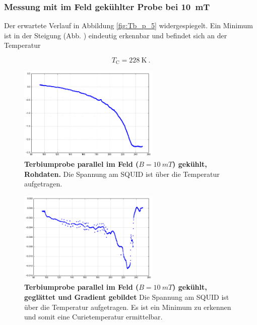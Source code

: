 \documentclass[a4paper,ngerman]{scrartcl}
\begin{document}
\subsubsection*{Messung mit im Feld gekühlter Probe bei \SI{10}{mT}}

Der erwartete Verlauf in Abbildung \ref{fig:Tb_p_5} widergespiegelt.
Ein Minimum ist in der Steigung (Abb. ) eindeutig erkennbar und befindet sich an der Temperatur

\begin{equation}
T_{\mathrm{C}} = \SI{228}{\K} ~.
\end{equation}



\begin{figure}
\centering
\includegraphics[width=0.6\textwidth]{abbildungen/Tb_p_10.png}
\caption[Terbiumprobe parallel bei 10mT]{\textbf{Terbiumprobe parallel im Feld ($B = \SI{10}{mT}$) gekühlt, Rohdaten.} 
Die Spannung am SQUID ist über die Temperatur aufgetragen. }
\label{fig:Tb_p_10}
\end{figure}

\begin{figure}
\centering
\includegraphics[width=0.6\textwidth]{abbildungen/Tb_p_10_grad.png}
\caption[Terbiumprobe parallel bei 10mT]{\textbf{Terbiumprobe parallel im Feld ($B = \SI{10}{mT}$) gekühlt, geglättet und Gradient gebildet} 
Die Spannung am SQUID ist über die Temperatur aufgetragen. 
Es ist ein Minimum zu erkennen und somit eine Curietemperatur ermittelbar.}
\label{fig:Tb_p_10_grad}
\end{figure}
\end{document}
